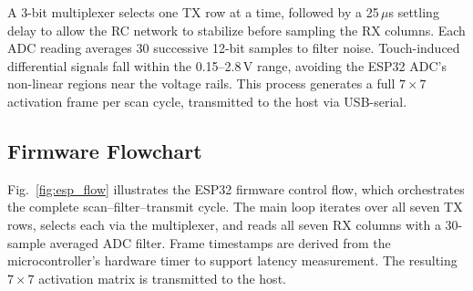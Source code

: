 \documentclass[conference]{IEEEtran}
\begin{document}
    A 3-bit multiplexer selects one TX row at a time, followed by a 25\,$\mu$s settling delay to allow the RC network 
    to stabilize before sampling the RX columns. Each ADC reading averages 30 successive 12-bit samples to filter noise. 
    Touch-induced differential signals fall within the 0.15--2.8\,V range, avoiding the ESP32 ADC's non-linear regions near 
    the voltage rails. This process generates a full $7\times7$ activation frame per scan cycle, transmitted to the host via 
    USB-serial. 

    \subsection{Firmware Flowchart}

    Fig.~\ref{fig:esp_flow} illustrates the ESP32 firmware control flow, which orchestrates the complete scan--filter--transmit cycle. 
    The main loop iterates over all seven TX rows, selects each via the multiplexer, and reads all seven RX columns 
    with a 30-sample averaged ADC filter. Frame timestamps are derived from the microcontroller's hardware timer to support latency measurement. 
    The resulting $7\times7$ activation matrix is transmitted to the host.
\end{document}
